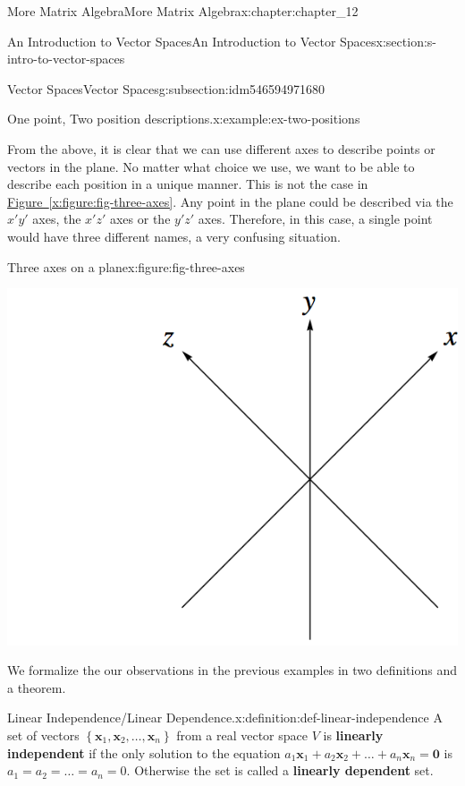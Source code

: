 \documentclass[oneside,10pt,]{book}
\newcommand{\xreffont}{\relax}
\newcommand{\terminology}[1]{\textbf{#1}}
\numberwithin{equation}{section}
\renewcommand{\vec}[1]{\mathbf{#1}}
\begin{document}
\begin{chapterptx}{More Matrix Algebra}{}{More Matrix Algebra}{}{}{x:chapter:chapter_12}
\begin{sectionptx}{An Introduction to Vector Spaces}{}{An Introduction to Vector Spaces}{}{}{x:section:s-intro-to-vector-spaces}
\begin{subsectionptx}{Vector Spaces}{}{Vector Spaces}{}{}{g:subsection:idm546594971680}
\begin{example}{One point, Two position descriptions.}{x:example:ex-two-positions}
\par
From the above, it is clear that we can use different axes to describe points or vectors in the plane. No matter what choice we use, we want to be able to describe each position in a unique manner. This is not the case in \hyperref[x:figure:fig-three-axes]{Figure~{\xreffont\ref{x:figure:fig-three-axes}}}. Any point in the plane could be described via the \(x'y'\) axes, the \(x'z'\) axes or the \(y'z'\) axes. Therefore, in this case, a single point would have three different names, a very confusing situation.%
\begin{figureptx}{Three axes on a plane}{x:figure:fig-three-axes}{}%
\begin{image}{0.25}{0.5}{0.25}%
\includegraphics[width=\linewidth]{images/fig-three-axes.png}
\end{image}%
\tcblower
\end{figureptx}%
\end{example}
We formalize the our observations in the previous examples in two definitions and a theorem.%
\begin{definition}{Linear Independence\slash{}Linear Dependence.}{x:definition:def-linear-independence}%
%
%
A set of vectors \(\left\{\vec{x}_1,\vec{x}_2, \ldots ,\vec{x}_n\right\}\) from a real vector space \(V\)  is \terminology{linearly independent} if the only solution to the equation \(a_1 \vec{x}_1+a_2 \vec{x}_2+\ldots
+a_n \vec{x}_n= \vec{0}\) is  \(a_1 = a_2 = \ldots  = a_n = 0\). Otherwise the set is called a \terminology{linearly dependent} set.%

\end{definition}
\end{subsectionptx}
\end{sectionptx}
\end{chapterptx}
\end{document}
